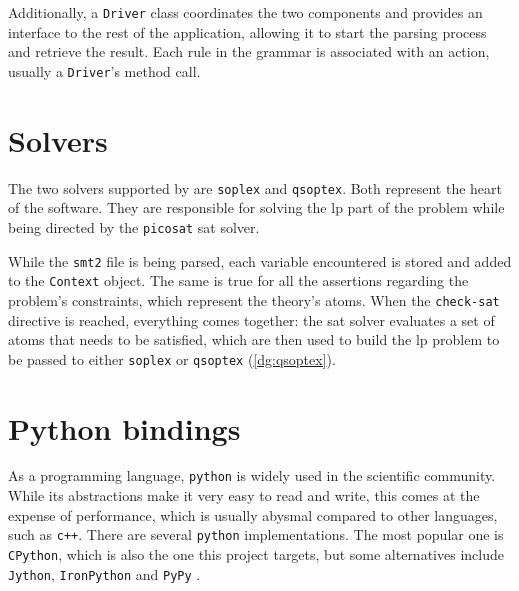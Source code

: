 Additionally, a \texttt{Driver} class coordinates the two components and provides an interface to the rest of the application, allowing it to start the parsing process and retrieve the result.
Each rule in the grammar is associated with an action, usually a \texttt{Driver}'s method call.





\section{Solvers}

The two solvers supported by \dlinear are \texttt{soplex} and \texttt{qsoptex}.
Both represent the heart of the software.
They are responsible for solving the \gls{lp} part of the problem while being directed by the \texttt{picosat} \gls{sat} solver.

While the \texttt{smt2} file is being parsed, each variable encountered is stored and added to the \texttt{Context} object.
The same is true for all the assertions regarding the problem's constraints, which represent the theory's atoms.
When the \texttt{check-sat} directive is reached, everything comes together: the \gls{sat} solver evaluates a set of atoms that needs to be satisfied, which are then used to build the \gls{lp} problem to be passed to either \texttt{soplex} or \texttt{qsoptex} (\autoref{dg:qsoptex}).


\section{Python bindings}

As a programming language, \texttt{python} is widely used in the scientific community.
While its abstractions make it very easy to read and write, this comes at the expense of performance, which is usually abysmal compared to other languages, such as \texttt{c++}.
There are several \texttt{python} implementations.
The most popular one is \texttt{CPython}, which is also the one this project targets, but some alternatives include \texttt{Jython}, \texttt{IronPython} and \texttt{PyPy} \cite{man:python-implementations}.

